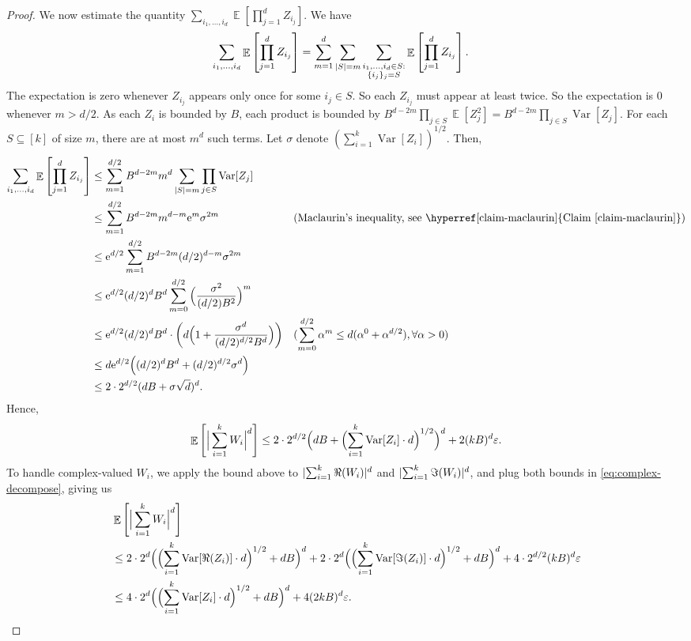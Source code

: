 \documentclass[11pt]{article}
\numberwithin{equation}{section}
\theoremstyle{definition}
\theoremstyle{plain}
\newcommand{\eee}{\mathrm e}
\newcommand{\expref}[2]{\hyperref[#2]{#1~\ref{#2}}}
\def\eps{\varepsilon}
\DeclarePairedDelimiter{\abs}{\lvert}{\rvert}
\DeclareMathOperator*{\E}{\mathbb{E}}                 %
\DeclareMathOperator*{\Var}{Var}                 %
\begin{document}
\begin{proof}
    We now estimate the quantity $\sum_{i_1, \ldots, i_d} \E \left[ \prod_{j = 1}^d Z_{i_j} \right]$.
    We have
    \begin{align*}
      \sum_{i_1, \ldots, i_d} \E \left[ \prod_{j = 1}^d Z_{i_j} \right]
      &= \sum_{m=1}^d \sum_{\abs{S} = m} \sum_{\substack{i_1, \ldots, i_d \in S: \\ \{i_j\}_j = S}} \E \left[ \prod_{j=1}^d Z_{i_j} \right] .
    \end{align*}
    The expectation is zero whenever $Z_{i_j}$ appears only once for some $i_j \in S$.
    So each $Z_{i_j}$ must appear at least twice.
    So the expectation is $0$ whenever $m > d/2$.
    As each $Z_i$ is bounded by $B$, each product is bounded by $B^{d - 2m} \prod_{j \in S} \E[Z_j^2] = B^{d - 2m} \prod_{j \in S} \Var[Z_j]$.
    For each $S \subseteq [k]$ of size $m$, there are at most $m^d$ such terms.
    Let $\sigma$ denote $(\sum_{i = 1}^k \Var[Z_i])^{1/2}$.
    Then,
    \begin{align*}
      \sum_{i_1, \ldots, i_d} \E \left[ \prod_{j = 1}^d Z_{i_j} \right]
      &\le \sum_{m=1}^{d/2} B^{d - 2m} m^d \sum_{\abs{S} = m} \prod_{j \in S} \Var[Z_j] &&\\
      &\le \sum_{m=1}^{d/2} B^{d - 2m} m^{d-m} \eee^m \sigma^{2m} && \text{(Maclaurin's inequality, see \expref{Claim}{claim-maclaurin})} \\
      &\le \eee^{d/2} \sum_{m=1}^{d/2} B^{d - 2m} (d/2)^{d - m} \sigma^{2m} \\
      &\le \eee^{d/2} (d/2)^d B^d \sum_{m=0}^{d/2} \Big( \frac{\sigma^2}{(d/2) B^2} \Big)^m \\
      &\le \eee^{d/2} (d/2)^d B^d \cdot \left(d \Big( 1 + \frac{\sigma^d}{(d/2)^{d/2} B^d} \Big) \right) && \text{($\sum_{m=0}^{d/2} \alpha^m \le d (\alpha^0 + \alpha^{d/2}), \forall \alpha > 0$)}\\
      &\le d \eee^{d/2} \Big( (d/2)^d B^d + (d/2)^{d/2} \sigma^d \Big) \\
      &\le 2 \cdot 2^{d/2} ( d B + \sigma \sqrt{d})^d .
    \end{align*}
    Hence,
    \[
      \E \left[ \Big| \sum_{i = 1}^k W_i \Big|^d \right]
      \le 2 \cdot 2^{d/2} \Bigl( dB + \Bigl( \sum_{i=1}^k \Var[Z_i] \cdot d \Bigr)^{1/2} \Bigr)^d + 2 (kB)^d \eps.
    \]
    To handle complex-valued $W_i$, we apply the bound above to $\abs{\sum_{i=1}^k \Re(W_i)}^d$ and $\abs{\sum_{i=1}^k \Im(W_i)}^d$, and plug both bounds in \eqref{eq:complex-decompose}, giving us
    \begin{align*}
      &\E \left[ \Big| \sum_{i=1}^k W_i \Big|^d \right] \\
      &\le 2 \cdot 2^d \Bigl( \Bigl( \sum_{i=1}^k \Var[\Re(Z_i)] \cdot d \Bigr)^{1/2} + d B \Bigr)^d + 2 \cdot 2^d \Bigl( \Bigl( \sum_{i=1}^k \Var[\Im(Z_i)] \cdot d \Bigr)^{1/2} + d B \Bigr)^d + 4 \cdot 2^{d/2} (kB)^d \eps \\
      &\le 4 \cdot 2^d \Bigl( \Bigl( \sum_{i=1}^k \Var[Z_i] \cdot d \Bigr)^{1/2} + d B \Bigr)^d + 4 (2kB)^d \eps . \qedhere
    \end{align*}
  \end{proof}
\end{document}
